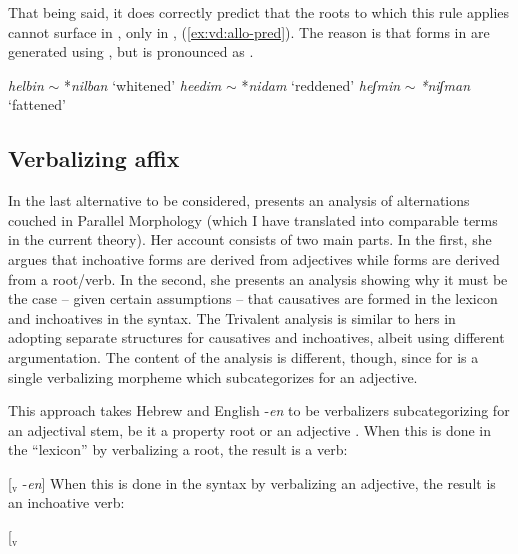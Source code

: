 \begin{exe}
\begin{xlist}
\begin{xlist}
\begin{exe}
\begin{exe}
\begin{xlist}
\begin{exe}
\begin{xlist}
\begin{exe}
\begin{xlist}
\begin{xlist}
\begin{exe}
\begin{xlist}
\begin{exe}
\begin{xlist}
\begin{exe}
\begin{exe}
\begin{exe}
\begin{xlist}
\begin{exe}
\begin{exe}
\begin{xlist}
\begin{xlist}
\begin{exe}
\begin{xlist}
\begin{exe}
\begin{exe}
\begin{exe}
\begin{xlist}
\begin{exe}
\begin{exe}
\begin{xlist}
\begin{exe}
\begin{xlist}
\begin{exe}
\begin{xlist}
\begin{exe}
\begin{xlist}
\begin{exe}
\begin{exe}
\begin{xlist}
\begin{exe}
\begin{exe}
\begin{xlist}
\begin{xlist}
\begin{exe}
\begin{xlist}
\begin{xlist}
\begin{exe}
\begin{xlist}
\begin{exe}
\begin{xlist}
\begin{exe}
\begin{xlist}
\begin{exe}
\begin{xlist}
\begin{exe}
\begin{exe}
\begin{exe}
\begin{exe}
\begin{xlist}
\begin{exe}
\begin{exe}
\begin{xlist}
\begin{xlist}
\begin{exe}
\begin{exe}
\begin{xlist}
\begin{exe}
\begin{xlist}
\begin{exe}
\begin{xlist}
\begin{exe}
\begin{xlist}
That being said, it does correctly predict that the roots to which this rule applies cannot surface in {\tnif}, only in {\thit}, (\ref{ex:vd:allo-pred}). The reason is that forms in {\tnif} are generated using {\vz}, but {\vz} is pronounced as {\thif}.
 \begin{exe}
\ex \label{ex:vd:allo-pred} 
	\begin{xlist}
		\ex  \emph{helbin} $\sim$ *\emph{nilban} `whitened' 
		\ex \emph{heedim} $\sim$ *\emph{nidam} `reddened'
		\ex \emph{heʃmin} $\sim$ \emph{*niʃman} `fattened'
	\z
 \z 

	\subsection{Verbalizing affix} \label{vd:others:borer}
In the last alternative to be considered, \cite{borer91} presents an analysis of {\thif} alternations couched in Parallel Morphology (which I have translated into comparable terms in the current theory). Her account consists of two main parts. In the first, she argues that inchoative forms are derived from adjectives while  forms are derived from a root/verb. In the second, she presents an analysis showing why it must be the case -- given certain assumptions -- that causatives are formed in the lexicon and inchoatives in the syntax. The Trivalent analysis is similar to hers in adopting separate structures for causatives and inchoatives, albeit using different argumentation. The content of the analysis is different, though, since for \cite{borer91} {\thif} is a single verbalizing morpheme which subcategorizes for an adjective.

This approach takes Hebrew {\thif} and English -\emph{en} to be verbalizers subcategorizing for an adjectival stem, be it a property root or an adjective \citep[136]{borer91}. 
When this is done in the ``lexicon'' by verbalizing a root, the result is a  verb:
 \begin{exe}
\ex \label{ex:vd:thif-borer-caus}{[}$_{\text{v}}$  -\emph{en}] 
 \z 
When this is done in the syntax by verbalizing an adjective, the result is an inchoative verb:
 \begin{exe}
\ex \label{ex:vd:thif-borer-inch}{[}$_{\text{v}}$ 
\end{exe}
\end{exe}
\end{xlist}
\end{exe}
\end{xlist}
\end{exe}
\end{xlist}
\end{exe}
\end{xlist}
\end{exe}
\end{xlist}
\end{exe}
\end{exe}
\end{xlist}
\end{xlist}
\end{exe}
\end{exe}
\end{xlist}
\end{exe}
\end{exe}
\end{exe}
\end{exe}
\end{xlist}
\end{exe}
\end{xlist}
\end{exe}
\end{xlist}
\end{exe}
\end{xlist}
\end{exe}
\end{xlist}
\end{xlist}
\end{exe}
\end{xlist}
\end{xlist}
\end{exe}
\end{exe}
\end{xlist}
\end{exe}
\end{exe}
\end{xlist}
\end{exe}
\end{xlist}
\end{exe}
\end{xlist}
\end{exe}
\end{xlist}
\end{exe}
\end{exe}
\end{xlist}
\end{exe}
\end{exe}
\end{exe}
\end{xlist}
\end{exe}
\end{xlist}
\end{xlist}
\end{exe}
\end{exe}
\end{xlist}
\end{exe}
\end{exe}
\end{exe}
\end{xlist}
\end{exe}
\end{xlist}
\end{exe}
\end{xlist}
\end{xlist}
\end{exe}
\end{xlist}
\end{exe}
\end{xlist}
\end{exe}
\end{exe}
\end{xlist}
\end{xlist}
\end{exe}
